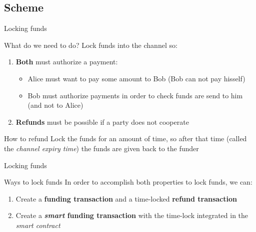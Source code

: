 \documentclass{beamer}
\begin{document}
\subsection{Scheme}
\begin{frame}{Locking funds}
 \begin{block}{What do we need to do?}
  Lock funds into the channel so:
  \pause
  \begin{enumerate}[<+->]
   \item \textbf{Both} must authorize a payment:
         \begin{itemize}[<+->]
          \item Alice must want to pay some amount to Bob (Bob can not pay hisself)
          \item Bob must authorize payments in order to check funds are send to him (and not to Alice)
         \end{itemize}
   \item \textbf{Refunds} must be possible if a party does not cooperate
  \end{enumerate}
 \end{block}
 \pause
 \begin{block}{How to refund}
  Lock the funds for an amount of time, so after that time (called the \textit{channel expiry time}) the funds are given back to the funder
 \end{block}
\end{frame}
\begin{frame}{Locking funds}
 \begin{block}{Ways to lock funds}
  In order to accomplish both properties to lock funds, we can:
  \pause
  \begin{enumerate}[<+->]
   \item Create a \textbf{funding transaction} and a time-locked \textbf{refund transaction}
   \item Create a \textbf{\textit{smart} funding transaction} with
         the time-lock integrated in the \textit{smart contract}
  \end{enumerate}
 \end{block}
\end{frame}
\end{document}
